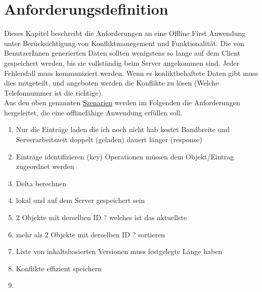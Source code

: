 \chapter{\label{chap:anforderungen}Anforderungsdefinition}
Dieses Kapitel beschreibt die Anforderungen an eine Offline First Anwendung unter Berücksichtigung von Konfliktmanegement und Funktionalität.
Die von BenutzerInnen generierten Daten sollten wenigstens so lange auf dem Client gespeichert werden, bis sie vollständig beim Server angekommen sind. Jeder Fehlersfall muss kommuniziert werden. Wenn es konliktbehaftete Daten gibt muss dies mitgeteilt, und angeboten werden die Konflikte zu lösen (Welche Telefonnummer ist die richtige).\\
Aus den oben genannten \hyperref[chap:szenarien]{Szenarien} werden im Folgenden die Anforderungen hergeleitet, die eine offlinefähige Anwendung  erfüllen soll.
\begin{enumerate}
  \item Nur die Einträge laden die ich noch nicht hab
    \subitem kostet Bandbreite und Serverarbeitszeit
    \subitem doppelt (geladen)
    \subitem dauert länger (response)
  \item Einträge identifizieren (key)
    \subitem Operationen müssen dem Objekt/Eintrag zugeordnet werden
  \item Delta berechnen
  \item lokal und auf dem Server gespeichert sein
  \item 2 Objekte mit derselben ID ? welches ist das aktuellste
  \item mehr als 2 Objekte mit derselben ID ? sortieren
  \item Liste von inhaltsbasierten Versionen muss festgelegte Länge haben
  \item Konflikte effizient speichern
  \item
\end{enumerate}
%
%

%
%
